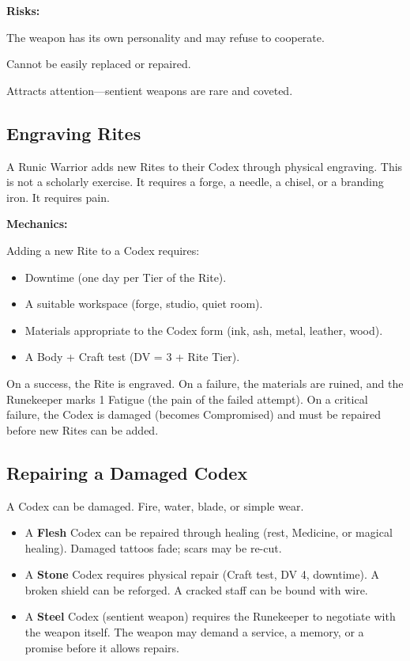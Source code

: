 \textbf{Risks:}
\item The weapon has its own personality and may refuse to cooperate.
\item Cannot be easily replaced or repaired.
\item Attracts attention—sentient weapons are rare and coveted.

\subsection{Engraving Rites}

A Runic Warrior adds new Rites to their Codex through physical engraving. This is not a scholarly exercise. It requires a forge, a needle, a chisel, or a branding iron. It requires pain.

\textbf{Mechanics:}

Adding a new Rite to a Codex requires:
\begin{itemize}
\item Downtime (one day per Tier of the Rite).
\item A suitable workspace (forge, studio, quiet room).
\item Materials appropriate to the Codex form (ink, ash, metal, leather, wood).
\item A Body + Craft test (DV = 3 + Rite Tier).
\end{itemize}

On a success, the Rite is engraved. On a failure, the materials are ruined, and the Runekeeper marks 1 Fatigue (the pain of the failed attempt). On a critical failure, the Codex is damaged (becomes Compromised) and must be repaired before new Rites can be added.

\subsection{Repairing a Damaged Codex}

A Codex can be damaged. Fire, water, blade, or simple wear.

\begin{itemize}
\item A \textbf{Flesh} Codex can be repaired through healing (rest, Medicine, or magical healing). Damaged tattoos fade; scars may be re-cut.
\item A \textbf{Stone} Codex requires physical repair (Craft test, DV 4, downtime). A broken shield can be reforged. A cracked staff can be bound with wire.
\item A \textbf{Steel} Codex (sentient weapon) requires the Runekeeper to negotiate with the weapon itself. The weapon may demand a service, a memory, or a promise before it allows repairs.
\end{itemize}

